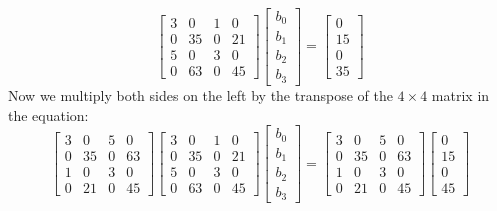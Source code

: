 \documentclass{scrartcl}
\begin{document}
\begin{displaymath}
\begin{bmatrix}
3 & 0 & 1 & 0\\
0 & 35 & 0 & 21\\
5 & 0 & 3 & 0\\
0 & 63 & 0 & 45 
\end{bmatrix}
\begin{bmatrix}
b_0\\
b_1\\
b_2\\
b_3
\end{bmatrix}
= \begin{bmatrix}
0\\
15\\
0\\
35
\end{bmatrix}
\end{displaymath}
Now we multiply both sides on the left by the transpose of the $4 \times 4$ matrix in the equation:
\begin{displaymath}
\begin{bmatrix}
3 & 0 & 5 & 0\\
0 & 35 & 0 & 63\\
1 & 0 & 3 & 0\\
0 & 21 & 0 & 45
\end{bmatrix}
\begin{bmatrix}
3 & 0 & 1 & 0\\
0 & 35 & 0 & 21\\
5 & 0 & 3 & 0\\
0 & 63 & 0 & 45
\end{bmatrix}
\begin{bmatrix}
b_0\\
b_1\\
b_2\\
b_3
\end{bmatrix}
= \begin{bmatrix}
3 & 0 & 5 & 0\\
0 & 35 & 0 & 63\\
1 & 0 & 3 & 0\\
0 & 21 & 0 & 45 
\end{bmatrix}
\begin{bmatrix}
0\\
15\\
0\\
45
\end{bmatrix}
\end{displaymath}
\end{document}
